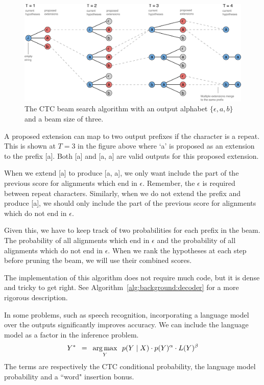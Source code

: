 \begin{figure}
\centering
\includegraphics[width=\textwidth]{background/figures/prefix_beam_search.pdf}
\caption{The CTC beam search algorithm with an output alphabet $\{\epsilon, a,
    b\}$ and a beam size of three.}
\end{figure}

A proposed extension can map to two output prefixes if the character is a
repeat. This is shown at $T=3$ in the figure above where `a’ is proposed as an
extension to the prefix [a]. Both [a] and [a, a] are valid outputs for this
proposed extension.

When we extend [a] to produce [a, a], we only want include the part of the
previous score for alignments which end in $\epsilon$. Remember, the $\epsilon$
is required between repeat characters. Similarly, when we do not extend the
prefix and produce [a], we should only include the part of the previous score
for alignments which do not end in $\epsilon$.

Given this, we have to keep track of two probabilities for each prefix in the
beam. The probability of all alignments which end in $\epsilon$ and the
probability of all alignments which do not end in $\epsilon$. When we rank the
hypotheses at each step before pruning the beam, we will use their combined
scores.

The implementation of this algorithm does not require much code, but it is
dense and tricky to get right. See Algorithm~\ref{alg:background:decoder} for a
more rigorous description.


In some problems, such as speech recognition, incorporating a language model
over the outputs significantly improves accuracy. We can include the language
model as a factor in the inference problem.
\begin{align*}
Y^* \enspace = \enspace \operatorname*{arg\,max}_Y \enspace
        p(Y \mid X) \cdot p(Y)^\alpha \cdot L(Y)^\beta
\end{align*}
The terms are respectively the CTC conditional probability, the language model
probability and a ``word" insertion bonus.

